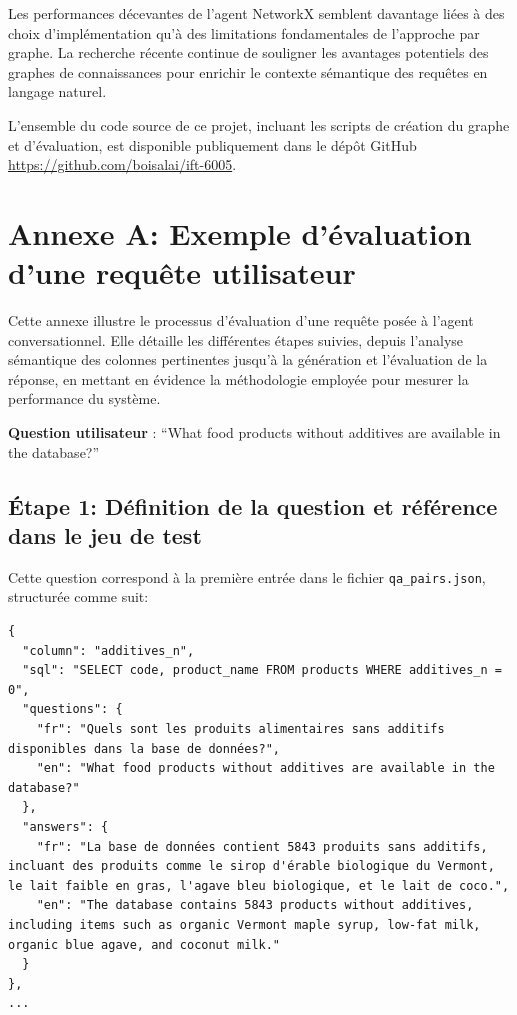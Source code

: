 \documentclass[a4paper,11pt]{article}
\begin{document}
Les performances décevantes de l'agent NetworkX semblent davantage liées à des choix d'implémentation qu'à des limitations fondamentales de l'approche par graphe. La recherche récente continue de souligner les avantages potentiels des graphes de connaissances pour enrichir le contexte sémantique des requêtes en langage naturel.

L'ensemble du code source de ce projet, incluant les scripts de création du graphe et d'évaluation, est disponible publiquement dans le dépôt GitHub \url{https://github.com/boisalai/ift-6005}.



\label{sec:biblio}




\newpage
\section*{Annexe A: Exemple d'évaluation d'une requête utilisateur}

Cette annexe illustre le processus d’évaluation d’une requête posée à l’agent conversationnel. Elle détaille les différentes étapes suivies, depuis l’analyse sémantique des colonnes pertinentes jusqu’à la génération et l’évaluation de la réponse, en mettant en évidence la méthodologie employée pour mesurer la performance du système.

\textbf{Question utilisateur} : 
\enquote{What food products without additives are available in the database?}


\subsection*{Étape 1: Définition de la question et référence dans le jeu de test}

Cette question correspond à la première entrée dans le fichier \texttt{qa\_pairs.json}, structurée comme suit:


\begin{lstlisting}
{
  "column": "additives_n",
  "sql": "SELECT code, product_name FROM products WHERE additives_n = 0",
  "questions": {
    "fr": "Quels sont les produits alimentaires sans additifs disponibles dans la base de données?",
    "en": "What food products without additives are available in the database?"
  },
  "answers": {
    "fr": "La base de données contient 5843 produits sans additifs, incluant des produits comme le sirop d'érable biologique du Vermont, le lait faible en gras, l'agave bleu biologique, et le lait de coco.",
    "en": "The database contains 5843 products without additives, including items such as organic Vermont maple syrup, low-fat milk, organic blue agave, and coconut milk."
  }
},
...
\end{lstlisting}
\end{document}
